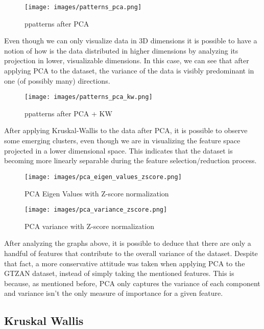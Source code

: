 \documentclass[12pt, a4paper]{article}
\begin{document}
\begin{figure}[H]
\centering
\texttt{[image: images/patterns\_pca.png]}
\caption{ppatterns after PCA}
\label{fig:myimage}
\end{figure}

Even though we can only visualize data in 3D dimensions it is possible to have a notion of how is the data distributed in higher dimensions by analyzing its projection in lower, visualizable dimensions. In this case, we can see that after applying PCA to the dataset, the variance of the data is visibly predominant in one (of possibly many) directions. 

\begin{figure}[H]
\centering
\texttt{[image: images/patterns\_pca\_kw.png]}
\caption{ppatterns after PCA + KW}
\label{fig:myimage}
\end{figure}

After applying Kruskal-Wallis to the data after PCA, it is possible to observe some emerging clusters, even though we are in visualizing the feature space projected in a lower dimensional space. This indicates that the dataset is becoming more linearly separable during the feature selection/reduction process. 

\begin{figure}[H]
\centering
\texttt{[image: images/pca\_eigen\_values\_zscore.png]}
\caption{PCA Eigen Values with Z-score normalization}
\label{fig:myimage}
\end{figure}

\begin{figure}[H]
\centering
\texttt{[image: images/pca\_variance\_zscore.png]}
\caption{PCA variance with Z-score normalization}
\label{fig:myimage}
\end{figure}

After analyzing the graphs above, it is possible to deduce that there are only a handful of features that contribute to the overall variance of the dataset. Despite that fact, a more conservative attitude was taken when applying PCA to the GTZAN dataset, instead of simply taking the mentioned features. This is because, as mentioned before, PCA only captures the variance of each component and variance isn't the only measure of importance for a given feature.


\subsection{Kruskal Wallis}
\end{document}
